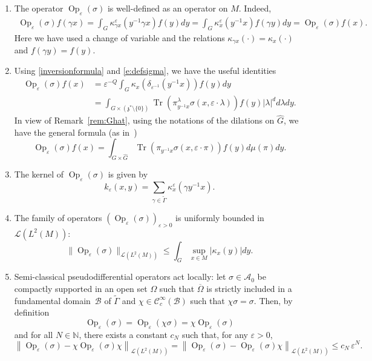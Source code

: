 \documentclass[10pt]{amsart}
\let\mathcal\mathscr
\DeclareMathOperator{\Op}{Op}
\DeclareMathOperator{\Tr}{Tr}
\theoremstyle{plain}
\theoremstyle{definition}
\let\eps\varepsilon
\def\N{{\mathbb N}}
\begin{document}
\begin{enumerate}
\item\label{fact:1}
The operator $\Op_\eps(\sigma)$ is well-defined as an operator on $M$. Indeed,
\begin{align*}
\Op_\eps(\sigma) f(\gamma x)
= \int_{ G} \kappa_{\gamma x}^\eps(y^{-1} \gamma x) f(y)dy
= \int_{ G} \kappa_{x}^\eps(y^{-1} x) f(\gamma y)dy
= \Op_\eps(\sigma) f(x).
\end{align*}
Here we have used a change of variable and the relations $\kappa_{\gamma x}(\cdot)=\kappa_x(\cdot)$ and $f(\gamma y)=f(y)$.

\item\label{fact:2}
Using \eqref{inversionformula} and \eqref{e:defsigma}, we have the useful identities
\begin{align*}
\Op_\eps(\sigma)f(x)
&=\eps^{-Q} \int_{ G} \kappa_x(\delta_{\eps^{-1}}(y^{-1} x)) f(y)dy
\\
&= \int_{G\times \left(\mathfrak z^*\setminus \{0\}\right)} \Tr (\pi^\lambda_{y^{-1} x} \sigma(x,\eps\cdot \lambda)) f(y) |\lambda|^d d\lambda dy.
\end{align*}
In view of Remark~\ref{rem:Ghat}, using the notations of the dilations on $\widehat G$, we have the general formula (as in~\cite[Rem.\,3.3]{FF1})
\[
\Op_\eps(\sigma)f(x)
= \int_{G\times \widehat G} \Tr (\pi_{y^{-1} x} \sigma(x,\eps\cdot \pi)) f(y) d\mu(\pi) dy.
\]

\item\label{fact:3}
The kernel of $\Op_\eps(\sigma)$ is given by
\[
k_\eps(x,y) = \sum_{\gamma\in \widetilde{\Gamma}} \kappa_{ x}^\eps(\gamma y^{-1} x).
\]
\item\label{fact:4} The family of operators $\left(\Op_\eps(\sigma)\right)_{\eps >0}$ is uniformly bounded in ${\mathcal L}(L^2(M))$:
\begin{equation}\label{eq:boundedness}
\| \Op_\eps (\sigma)\|_{\mathcal L(L^2(M))} \leq \int_{G} \sup_{x\in M} |\kappa_x(y)|dy.
\end{equation}
\item\label{fact:5} Semi-classical pseudodifferential operators act locally: let $\sigma\in{\mathcal A}_0$ be compactly supported in an open set $\Omega$ such that $\overline \Omega$ is strictly included in a fundamental domain~$\mathcal B$ of $\widetilde{\Gamma}$ and $\chi\in \mathcal C^\infty_c(\mathcal B)$ such that $\chi \sigma=\sigma$. Then, by definition
\[
\Op_\eps(\sigma)=\Op_\eps(\chi \sigma) =\chi \Op_\eps(\sigma)
\]
and for all $N\in \N$, there exists a constant $c_N$ such that, for any $\eps>0$,
\begin{equation}\label{eq:localisation}
\left\| \Op_\eps(\sigma) - \chi \Op_\eps(\sigma) \chi \right\| _{ \mathcal L(L^2(M))}=
\left\| \Op_\eps(\sigma) - \Op_\eps(\sigma) \chi \right\| _{ \mathcal L(L^2(M))}
\leq c_N \,\eps^N.
\end{equation}
\end{enumerate}
\end{document}
